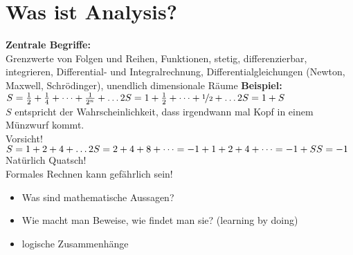 \documentclass[12pt,a4paper,titlepage]{article} %
\newcommand{\bsp}{\textbf{Beispiel:}}
\begin{document}
\section{Was ist Analysis?}
\textbf{Zentrale Begriffe:}\\
Grenzwerte von Folgen und Reihen, Funktionen, stetig, differenzierbar, integrieren, Differential- und Integralrechnung, Differentialgleichungen (Newton, Maxwell, Schrödinger), unendlich dimensionale Räume
\bsp\\
$S = \frac{1}{2} + \frac{1}{4} + \dots + \frac{1}{2^n} + \dots\\
2S = 1 + \frac{1}{2} + \dots + \nicefrac{1}{2} + \dots\\
2S = 1 + S$\\
$S$ entspricht der Wahrscheinlichkeit, dass irgendwann mal Kopf in einem Münzwurf kommt.\\
Vorsicht!\\
$S = 1 + 2 + 4 + \dots\\
2S = 2 + 4 + 8 + \dots = -1 + 1 + 2 + 4 + \dots = -1 + S\\
S = -1$\\
Natürlich Quatsch!\\
Formales Rechnen kann gefährlich sein!

\begin{itemize}
  \item Was sind mathematische Aussagen?
  \item Wie macht man Beweise, wie findet man sie? (learning by doing)
  \item logische Zusammenhänge
\end{itemize}
\end{document}
